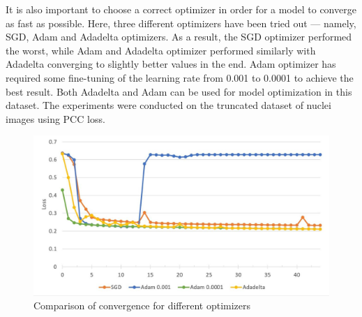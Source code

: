 It is also important to choose a correct optimizer in order for a model to converge as fast as possible. Here, three different optimizers have been tried out --- namely, SGD, Adam and Adadelta optimizers. As a result, the SGD optimizer performed the worst, while Adam and Adadelta optimizer performed similarly with Adadelta converging to slightly better values in the end. Adam optimizer has required some fine-tuning of the learning rate from 0.001 to 0.0001 to achieve the best result. Both Adadelta and Adam can be used for model optimization in this dataset. The experiments were conducted on the truncated dataset of nuclei images using PCC loss.

\begin{figure}[H]
	\begin{center}
		\includegraphics[width=0.8\linewidth]{bilder/model training/optimizer-comparison.jpg}
		\caption{Comparison of convergence for different optimizers}\label{fig:optimizers}
	\end{center}
\end{figure}
